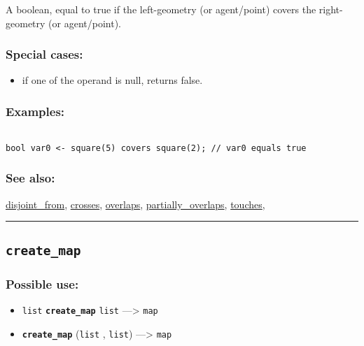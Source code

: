 \documentclass[]{book}
\providecommand{\tightlist}{%
  \setlength{\itemsep}{0pt}\setlength{\parskip}{0pt}}
\theoremstyle{definition}
\theoremstyle{definition}
\theoremstyle{definition}
\theoremstyle{remark}
\begin{document}
A boolean, equal to true if the left-geometry (or agent/point) covers
the right-geometry (or agent/point).

\subsubsection{Special cases:}\label{special-cases-42}

\begin{itemize}
\tightlist
\item
  if one of the operand is null, returns false.
\end{itemize}

\subsubsection{Examples:}\label{examples-86}

\begin{verbatim}
 
bool var0 <- square(5) covers square(2); // var0 equals true
\end{verbatim}

\subsubsection{See also:}\label{see-also-70}

\href{OperatorsDH\#disjoint_from}{disjoint\_from},
\href{OperatorsBC\#crosses}{crosses},
\href{OperatorsNR\#overlaps}{overlaps},
\href{OperatorsNR\#partially_overlaps}{partially\_overlaps},
\href{OperatorsSZ\#touches}{touches},

\begin{center}\rule{0.5\linewidth}{\linethickness}\end{center}

\subsection{\texorpdfstring{\texttt{create\_map}}{create\_map}}\label{create_map}

\subsubsection{Possible use:}\label{possible-use-115}

\begin{itemize}
\tightlist
\item
  \texttt{list} \textbf{\texttt{create\_map}} \texttt{list}
  ---\textgreater{} \texttt{map}
\item
  \textbf{\texttt{create\_map}} (\texttt{list} , \texttt{list})
  ---\textgreater{} \texttt{map}
\end{itemize}
\end{document}
